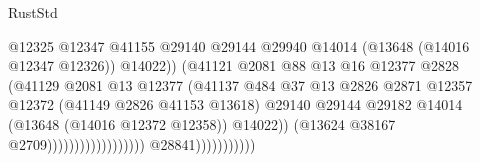 \begin{lexlean}{RustStd}
\begin{coremodule}
                                                              @12325
                                                              @12347
                                                              @41155
                                                              @29140
                                                              @29144
                                                              @29940
                                                              @14014
                                                              (@13648 (@14016 @12347 @12326))
                                                              @14022))
                                                          (@41121
                                                            @2081
                                                            @88
                                                            @13
                                                            @16
                                                            @12377
                                                            @2828
                                                            (@41129
                                                              @2081
                                                              @13
                                                              @12377
                                                              (@41137
                                                                @484
                                                                @37
                                                                @13
                                                                @2826
                                                                @2871
                                                                @12357
                                                                @12372
                                                                (@41149 @2826 @41153 @13618)
                                                                @29140
                                                                @29144
                                                                @29182
                                                                @14014
                                                                (@13648 (@14016 @12372 @12358))
                                                                @14022))
                                                            (@13624 @38167 @2709))))))))))))))))))
                          @28841)))))))))))

\end{coremodule}
\end{lexlean}
